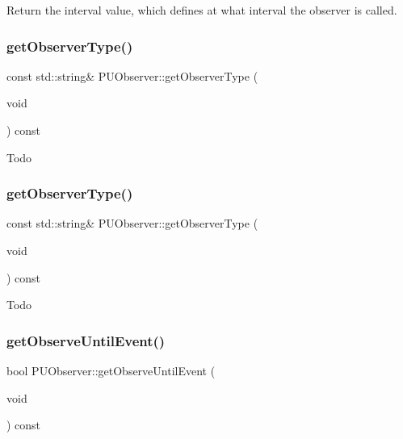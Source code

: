 Return the interval value, which defines at what interval the observer is called. \mbox{\label{classPUObserver_ada77c2db2e1e1d40237d41fcca481361}} 
\subsubsection{\texorpdfstring{get\+Observer\+Type()}{getObserverType()}\hspace{0.1cm}{\footnotesize\ttfamily [1/2]}}
{\footnotesize\ttfamily const std\+::string\& P\+U\+Observer\+::get\+Observer\+Type (\begin{DoxyParamCaption}\item[{void}]{ }\end{DoxyParamCaption}) const\hspace{0.3cm}{\ttfamily [inline]}}

Todo \mbox{\label{classPUObserver_ada77c2db2e1e1d40237d41fcca481361}} 
\subsubsection{\texorpdfstring{get\+Observer\+Type()}{getObserverType()}\hspace{0.1cm}{\footnotesize\ttfamily [2/2]}}
{\footnotesize\ttfamily const std\+::string\& P\+U\+Observer\+::get\+Observer\+Type (\begin{DoxyParamCaption}\item[{void}]{ }\end{DoxyParamCaption}) const\hspace{0.3cm}{\ttfamily [inline]}}

Todo \mbox{\label{classPUObserver_a7d44e67979d599d99333e20c2faa73f0}} 
\subsubsection{\texorpdfstring{get\+Observe\+Until\+Event()}{getObserveUntilEvent()}\hspace{0.1cm}{\footnotesize\ttfamily [1/2]}}
{\footnotesize\ttfamily bool P\+U\+Observer\+::get\+Observe\+Until\+Event (\begin{DoxyParamCaption}\item[{void}]{ }\end{DoxyParamCaption}) const}

